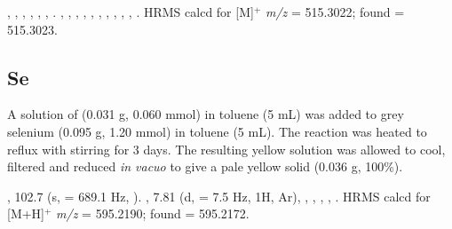 ,
,
,
,
,
,
.
,
,
,
,
,
,
,
,
,
,
.
HRMS calcd for  [M]$^+$ \emph{m/z} = 515.3022; found = 515.3023.


\subsection*{\tBuSixantphos Se}


A solution of \tBuXantphos{} (0.031 g, 0.060 mmol) in toluene (5 mL) was added to grey selenium (0.095 g, 1.20 mmol) in toluene (5 mL).  The reaction was heated to reflux with stirring for 3 days.  The resulting yellow solution was allowed to cool, filtered and reduced \emph{in vacuo} to give a pale yellow solid (0.036 g, 100\%).

,
102.7 (s, \JPSe{} = 689.1 Hz, ).
,
7.81 (d, \J{} = 7.5 Hz, 1H, Ar),
,
,
,
,
.
HRMS calcd for  [M+H]$^+$ \emph{m/z} = 595.2190; found = 595.2172.


